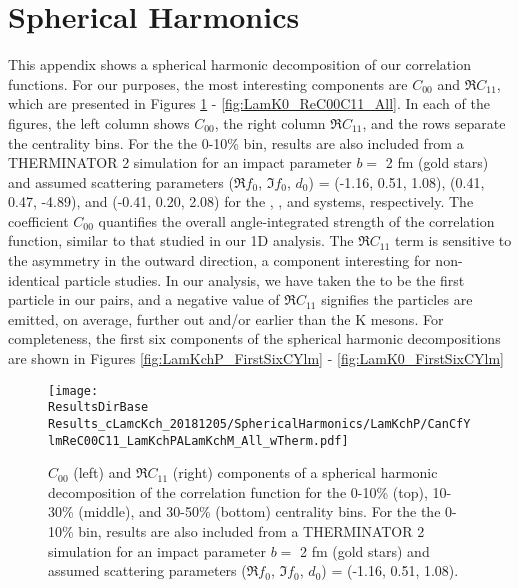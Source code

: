 \documentclass[/home/jesse/Analysis/FemtoAnalysis/AnalysisNotes/AnalysisNoteJBuxton.tex]{subfiles}
\begin{document}
\section{Spherical Harmonics}
\label{Appendix_SphericalHarmonics}

This appendix shows a spherical harmonic decomposition of our \LamKs correlation functions.
For our purposes, the most interesting components are $C_{00}$ and $\Re C_{11}$, which are presented in Figures \ref{fig:LamKchP_ReC00C11_All} - \ref{fig:LamK0_ReC00C11_All}.
In each of the figures, the left column shows $C_{00}$, the right column $\Re C_{11}$, and the rows separate the centrality bins.
For the the 0-10\% bin, results are also included from a THERMINATOR 2 simulation for an impact parameter $b = $ 2 fm (gold stars) and assumed scattering parameters ($\Re f_{0}$, $\Im f_{0}$, $d_{0}$) = (-1.16, 0.51, 1.08), (0.41, 0.47, -4.89), and (-0.41, 0.20, 2.08) for the \LamKchP, \LamKchM, and \LamKs systems, respectively.
The coefficient $C_{00}$ quantifies the overall angle-integrated strength of the correlation function, similar to that studied in our 1D analysis.
The $\Re C_{11}$ term is sensitive to the asymmetry in the outward direction, a component interesting for non-identical particle studies.
In our analysis, we have taken the \Lam to be the first particle in our pairs, and a negative value of $\Re C_{11}$ signifies the \Lam particles are emitted, on average, further out and/or earlier than the K mesons.
For completeness, the first six components of the spherical harmonic decompositions are shown in Figures \ref{fig:LamKchP_FirstSixCYlm} - \ref{fig:LamK0_FirstSixCYlm}

\begin{figure}[h]
  \centering
  \texttt{[image: \\ResultsDirBase Results\_cLamcKch\_20181205/SphericalHarmonics/LamKchP/CanCfYlmReC00C11\_LamKchPALamKchM\_All\_wTherm.pdf]}
  \caption[\LamKchP $C_{00}$ and $\Re C_{11}$ spherical harmonic components]
  {
  $C_{00}$ (left) and $\Re C_{11}$ (right) components of a spherical harmonic decomposition of the \LamKchP correlation function for the 0-10\% (top), 10-30\% (middle), and 30-50\% (bottom) centrality bins.
  For the the 0-10\% bin, results are also included from a THERMINATOR 2 simulation for an impact parameter $b = $ 2 fm (gold stars) and assumed scattering parameters ($\Re f_{0}$, $\Im f_{0}$, $d_{0}$) = (-1.16, 0.51, 1.08).
  }
  \label{fig:LamKchP_ReC00C11_All}
\end{figure}
\end{document}
